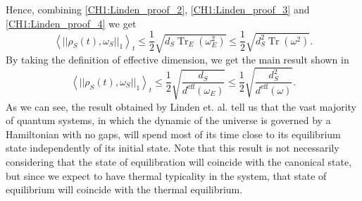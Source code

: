 Hence, combining \eqref{CH1:Linden_proof_2}, \eqref{CH1:Linden_proof_3} and \eqref{CH1:Linden_proof_4} we get
\begin{equation}
\left\langle ||\rho_{S}(t), \omega_{S}||_1\right\rangle_{t} \leq \frac{1}{2} \sqrt{d_{S} \operatorname{Tr}_{E}\left(\omega_{E}^{2}\right)} \leq \frac{1}{2} \sqrt{d_{S}^{2} \operatorname{Tr}\left(\omega^{2}\right)}.
\label{CH1:Inequality_last}
\end{equation}
By taking the definition of effective dimension, we get the main result shown in \cite{linden_quantum_2009}
\begin{equation}
\left\langle ||\rho_{S}(t), \omega_{S}||_1\right\rangle_{t} \leq \frac{1}{2} \sqrt{\frac{d_{S}}{d^{\mathrm{eff}}\left(\omega_{E}\right)}} \leq \frac{1}{2} \sqrt{\frac{d_{S}^{2}}{d^{\mathrm{eff}}(\omega) }}.
\label{CH1:Result_linden}
\end{equation}
As we can see, the result obtained by Linden et. al. tell us that the vast majority of quantum systems, in which the dynamic of the universe is governed by a Hamiltonian with no gaps, will spend most of its time close to its equilibrium state independently of its initial state. Note that this result is not necessarily considering that the state of equilibration will coincide with the canonical state, but since we expect to have thermal typicality in the system, that state of equilibrium will coincide with the thermal equilibrium.
